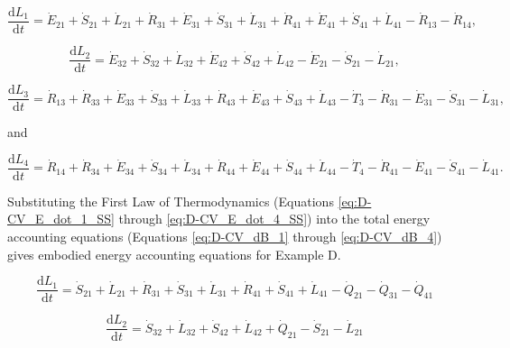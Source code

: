 \documentclass[authoryear,preprint,review,12pt]{elsarticle}
\begin{document}
\begin{equation} \label{eq:D-CV_dB_1}
	\frac{\mathrm{d}L_{1}}{\mathrm{d}t} 	 = \dot{E}_{21} + \dot{S}_{21} + \dot{L}_{21} + \dot{R}_{31} + \dot{E}_{31} + \dot{S}_{31} + \dot{L}_{31} + \dot{R}_{41} + \dot{E}_{41} + \dot{S}_{41} + \dot{L}_{41} - \dot{R}_{13} - \dot{R}_{14},
\end{equation}

\begin{equation} \label{eq:D-CV_dB_2}
	\frac{\mathrm{d}L_{2}}{\mathrm{d}t} 	 = \dot{E}_{32} + \dot{S}_{32} + \dot{L}_{32} + \dot{E}_{42} + \dot{S}_{42} + \dot{L}_{42} - \dot{E}_{21} - \dot{S}_{21} - \dot{L}_{21},
\end{equation}

\begin{equation} \label{eq:D-CV_dB_3}
	\frac{\mathrm{d}L_{3}}{\mathrm{d}t} 	 = \dot{R}_{13} + \dot{R}_{33} + \dot{E}_{33} + \dot{S}_{33} + \dot{L}_{33} + \dot{R}_{43} + \dot{E}_{43} + \dot{S}_{43} + \dot{L}_{43} - \dot{T}_{3} - \dot{R}_{31} - \dot{E}_{31} - \dot{S}_{31} - \dot{L}_{31},
\end{equation}

\noindent and 

\begin{equation} \label{eq:D-CV_dB_4}
	\frac{\mathrm{d}L_{4}}{\mathrm{d}t} 	 = \dot{R}_{14} + \dot{R}_{34} + \dot{E}_{34} + \dot{S}_{34} + \dot{L}_{34} + \dot{R}_{44} + \dot{E}_{44} + \dot{S}_{44} + \dot{L}_{44} - \dot{T}_{4} - \dot{R}_{41} - \dot{E}_{41} - \dot{S}_{41} - \dot{L}_{41}.
\end{equation}

Substituting the First Law of Thermodynamics (Equations \ref{eq:D-CV_E_dot_1_SS} through \ref{eq:D-CV_E_dot_4_SS}) into the total energy accounting equations (Equations \ref{eq:D-CV_dB_1} through \ref{eq:D-CV_dB_4}) gives embodied energy accounting equations for Example D.

\begin{equation} \label{eq:D-embodied_acct_1}
	\frac{\mathrm{d}L_{1}}{\mathrm{d}t} 	 = \dot{S}_{21} + \dot{L}_{21} + \dot{R}_{31} + \dot{S}_{31} + \dot{L}_{31} + \dot{R}_{41} +\dot{S}_{41} + \dot{L}_{41} - \dot{Q}_{21} - \dot{Q}_{31} - \dot{Q}_{41}
\end{equation}

\begin{equation} \label{eq:D-embodied_acct_2}
	\frac{\mathrm{d}L_{2}}{\mathrm{d}t} 	 = \dot{S}_{32} + \dot{L}_{32} + \dot{S}_{42} + \dot{L}_{42} + \dot{Q}_{21} - \dot{S}_{21} - \dot{L}_{21}
\end{equation}
\end{document}
